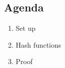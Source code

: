 

\subsection{Agenda}
\begin{enumerate}
\item Set up
\item Hash functions
\item Proof
\end{enumerate}

